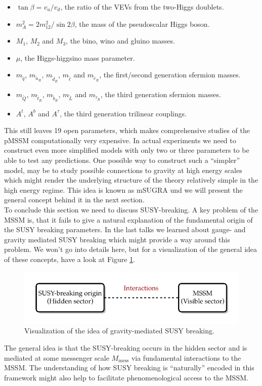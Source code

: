 \begin{itemize}
	\item $\tan\beta = v_u/v_d$, the ratio of the VEVs from the two-Higgs doublets.
	\item $m_{A}^2 = 2m_{12}^2  / \operatorname{sin} 2\beta$, the mass of the pseudoscalar Higgs boson.
	\item $M_{1}$, $M_{2}$ and $M_{3}$, the bino, wino and gluino masses.
	\item $\mu$, the Higgs-higgsino mass parameter.
	\item $m_{\tilde{q}}$, $m_{\tilde{u}_R}$, $m_{\tilde{d}_R}$, $m_{\tilde{\ell}}$ and $m_{\tilde{e}_R}$, the first/second generation sfermion masses.
	\item $m_{\tilde{Q}}$, $m_{\tilde{t}_R}$, $m_{\tilde{b}_R}$, $m_{\tilde{L}}$ and $m_{\tilde{\tau}_R}$, the third generation sfermion masses.
	\item $A^{t}$, $A^{b}$ and $A^{\tau}$, the third generation trilinear couplings.
\end{itemize}
This still leaves 19 open parameters, which makes comprehensive studies of the pMSSM computationally very expensive. In actual experiments we need to construct even more simplified models with only two or three parameters to be able to test any predictions. One possible way to construct such a \enquote{simpler} model, may be to study possible connections to gravity at high energy scales which might render the underlying structure of the theory relatively simple in the high energy regime. This idea is known as mSUGRA und we will present the general concept behind it in the next section. \\
To conclude this section we need to discuss SUSY-breaking. A key problem of the MSSM is, that it fails to give a natural explanation of the fundamental origin of the SUSY breaking parameters. In the last talks we learned about gauge- and gravity mediated SUSY breaking which might provide a way around this problem. We won't go into details here, but for a visualization of the general idea of these concepts, have a look at Figure \ref{fig:susy_breaking}. 
\begin{figure}[H]
\centering
\includegraphics[scale = 1]{figures/susy_breaking}
\caption{Visualization of the idea of gravity-mediated SUSY breaking.}
\label{fig:susy_breaking}
\end{figure}
\noindent
The general idea is that the SUSY-breaking occurs in the hidden sector and is mediated at some messenger scale $M_{\mathrm{mess}}$ via fundamental interactions to the MSSM. The understanding of how SUSY breaking is \enquote{naturally} encoded in this framework might also help to facilitate phenomenological access to the MSSM.